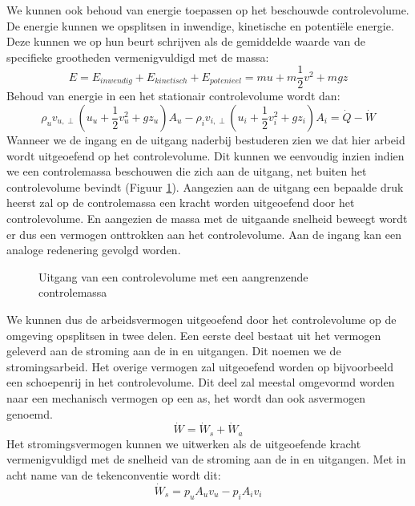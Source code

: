 We kunnen ook behoud van energie toepassen op het beschouwde controlevolume. De energie kunnen we opsplitsen in inwendige, kinetische en potentiële energie. Deze kunnen we op hun beurt schrijven als de gemiddelde waarde van de specifieke grootheden vermenigvuldigd met de massa:
\begin{equation}
	E = E_{inwendig} + E_{kinetisch} + E_{potenieel} = m u + m \frac{1}{2}v^2 + m g z
\end{equation}
Behoud van energie in een het stationair controlevolume wordt dan:
\begin{equation}
	\rho_{u} v_{u,\perp} (u_u + \frac{1}{2}v^2_u + g z_u) A_{u} - \rho_{i} v_{i,\perp} (u_i + \frac{1}{2}v^2_i + g z_i) A_{i} = \dot{Q}-\dot{W}
	\label{eqn:behoud van energie in een controlevolume met een in en uitstroming}
\end{equation}
Wanneer we de ingang en de uitgang naderbij bestuderen zien we dat hier arbeid wordt uitgeoefend op het controlevolume. Dit kunnen we eenvoudig inzien indien we een controlemassa beschouwen die zich aan de uitgang, net buiten het controlevolume bevindt (Figuur \ref{fig:stromingsarbeid}). Aangezien aan de uitgang een bepaalde druk heerst zal op de controlemassa een kracht worden uitgeoefend door het controlevolume. En aangezien de massa met de uitgaande snelheid beweegt wordt er dus een vermogen onttrokken aan het controlevolume. Aan de ingang kan een analoge redenering gevolgd worden.
\begin{figure}[htb]
	\centering
	
	\caption{Uitgang van een controlevolume met een aangrenzende controlemassa}
	\label{fig:stromingsarbeid}
\end{figure}
We kunnen dus de arbeidsvermogen uitgeoefend door het controlevolume op de omgeving opsplitsen in twee delen. Een eerste deel bestaat uit het vermogen geleverd aan de stroming aan de in en uitgangen. Dit noemen we de stromingsarbeid. Het overige vermogen zal uitgeoefend worden op bijvoorbeeld een schoepenrij in het controlevolume. Dit deel zal meestal omgevormd worden naar een mechanisch vermogen op een as, het wordt dan ook asvermogen genoemd.
\begin{equation}
	\dot{W} = \dot{W}_s + \dot{W}_a
	\label{eqn:stromings en asvermogen}
\end{equation}
Het stromingsvermogen kunnen we uitwerken als de uitgeoefende kracht vermenigvuldigd met de snelheid van de stroming aan de in en uitgangen. Met in acht name van de tekenconventie wordt dit:
\begin{equation}
	\dot{W}_s = p_u A_u v_u - p_i A_i v_i
	\label{eqn:stromingsvermogen}
\end{equation}
